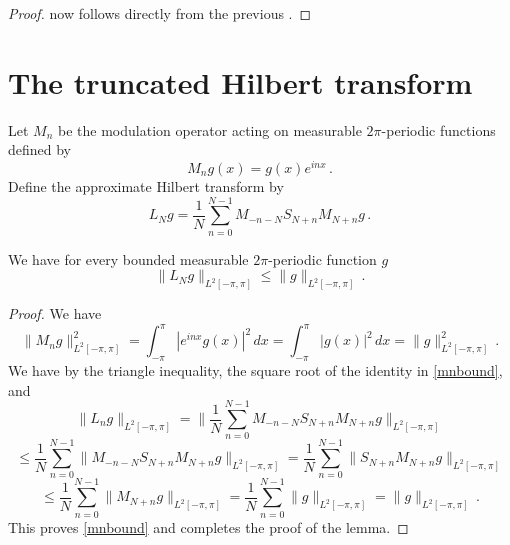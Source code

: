 \begin{proof}
\leanok
{}
     now follows directly from the previous .
\end{proof}


\section{The truncated Hilbert transform}
\label{10hilbert}





Let $M_n$ be the modulation operator
acting on measurable $2\pi$-periodic functions
defined by
\begin{equation}
    M_ng(x)=g(x) e^{inx}\, .
\end{equation}
Define the approximate Hilbert transform by
\begin{equation}
    L_N g=\frac 1N\sum_{n=0}^{N-1}
       M_{-n-N} S_{N+n}M_{N+n}g\, .
\end{equation}


\begin{lemma}
\label{modulated-averaged-projection}
We have for every bounded measurable $2\pi$-periodic function $g$
\begin{equation}\label{lnbound}
    \|L_Ng\|_{L^2[-\pi, \pi]}\le \|g\|_{L^2[-\pi, \pi]}\,.
\end{equation}
\end{lemma}
\begin{proof}
    We have
    \begin{equation}\label{mnbound}
        \|M_ng\|_{L^2[-\pi, \pi]}^2=\int_{-\pi}^{\pi} |e^{inx}g(x)|^2\, dx
        =\int_{-\pi}^{\pi} |g(x)|^2\, dx=\|g\|_{L^2[-\pi, \pi]}^2\, .
    \end{equation}
     We have by the triangle inequality, the square root of the identity in \eqref{mnbound}, and 
    \begin{equation*}
        \|L_ng\|_{L^2[-\pi, \pi]}=\|\frac 1N\sum_{n=0}^{N-1}
       M_{-n-N} S_{N+n}M_{N+n}g\|_{L^2[-\pi, \pi]}
    \end{equation*}
    \begin{equation*}
        \le \frac 1N\sum_{n=0}^{N-1} \|
       M_{-n-N} S_{N+n}M_{N+n}g\|_{L^2[-\pi, \pi]}
         = \frac 1N\sum_{n=0}^{N-1} \|
    S_{N+n}M_{N+n}g\|_{L^2[-\pi, \pi]}
    \end{equation*}
     \begin{equation}
     \le \frac 1N\sum_{n=0}^{N-1} \|
 M_{N+n}g\|_{L^2[-\pi, \pi]} = \frac 1N\sum_{n=0}^{N-1} \|
g\|_{L^2[-\pi, \pi]} =\|g\|_{L^2[-\pi, \pi]}\, .
    \end{equation}
This proves \eqref{mnbound} and completes the proof of the lemma.
\end{proof}

